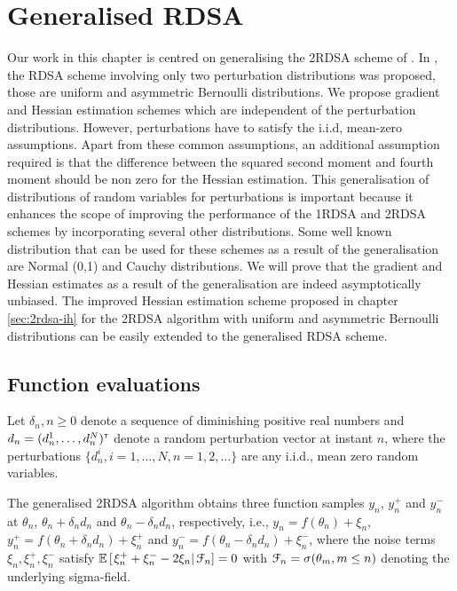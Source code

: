 \chapter{Generalised RDSA }
\label{sec:2rdsa-gen}
Our work in this chapter  is centred on generalising the 2RDSA scheme of \cite{prashanth2015rdsa}. In \cite{prashanth2015rdsa}, the RDSA scheme involving only two perturbation distributions was proposed, those are uniform and asymmetric Bernoulli distributions. We propose gradient and Hessian estimation schemes which are independent of the perturbation distributions. However, perturbations have to satisfy the i.i.d, mean-zero assumptions. Apart from these common assumptions,  an additional assumption required is that the difference between the squared second moment  and fourth moment should be non zero for the Hessian estimation. This generalisation of distributions of random variables for perturbations is important because it enhances the scope of improving the performance of the 1RDSA and 2RDSA schemes by incorporating several other distributions. Some well known distribution that can be used for these schemes as a result of the generalisation are Normal (0,1) and Cauchy distributions. We will prove that  the  gradient and Hessian estimates as a result of the generalisation are indeed asymptotically unbiased.
 The improved Hessian estimation scheme proposed in chapter \ref{sec:2rdsa-ih} for the  2RDSA algorithm with uniform and asymmetric Bernoulli distributions can be easily extended to the generalised RDSA scheme.

\section{Function evaluations}
Let $\delta_n, n\geq 0$ denote a sequence of diminishing positive real numbers and $d_n = (d_n^1,\ldots,d_n^N)^\mathsf{\scriptscriptstyle T}$ denote a random perturbation vector at instant $n$,
where the perturbations $\{d_n^i, i=1,\ldots,N, n=1,2,\ldots\}$ are any i.i.d., mean zero random variables. 

The generalised 2RDSA algorithm obtains three function samples $y_n$, $y_n^+$ and $y_n^-$ at $\theta_n$, $\theta_n+\delta_n d_n$ and $\theta_n - \delta_n d_n$, respectively, i.e.,
$y_n = f(\theta_n) + \xi_n$, $y_n^+ = f(\theta_n+\delta_n d_n) + \xi_n^+$ and 
$y_n^- = f(\theta_n-\delta_n d_n) + \xi_n^-$,
where the noise terms $\xi_n, \xi_n^+, \xi_n^-$ satisfy $\mathbb{E}\left[\left.\xi_n^+ + \xi_n^- - 2\xi_n \right| \mathcal{F}_n\right] = 0$ with $\mathcal{F}_n = \sigma(\theta_m,m\le n)$ denoting the underlying sigma-field. 

